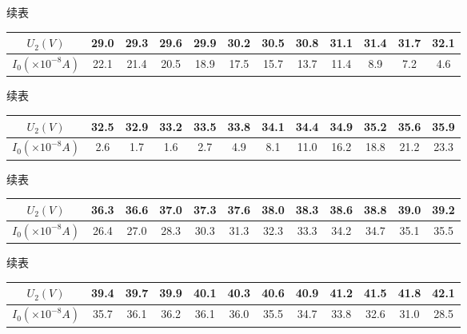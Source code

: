 \documentclass{article}
\begin{document}
    续表

    \begin{center}
        \begin{tabular}{|c|c|c|c|c|c|c|c|c|c|c|c|}
            \hline
            $U_2(V)$ & 29.0  & 29.3  & 29.6  & 29.9  & 30.2  & 30.5  & 30.8  & 31.1  & 31.4  & 31.7  & 32.1  \bigstrut\\
            \hline
            $I_0(\times 10^{-8}A)$ & 22.1  & 21.4  & 20.5  & 18.9  & 17.5  & 15.7  & 13.7  & 11.4  & 8.9   & 7.2   & 4.6  \bigstrut\\
            \hline
        \end{tabular}%
    \end{center}
    
    续表

    \begin{center}
        \begin{tabular}{|c|c|c|c|c|c|c|c|c|c|c|c|}
            \hline
            $U_2(V)$ & 32.5  & 32.9  & 33.2  & 33.5  & 33.8  & 34.1  & 34.4  & 34.9  & 35.2  & 35.6  & 35.9  \bigstrut\\
            \hline
            $I_0(\times 10^{-8}A)$ & 2.6   & 1.7   & 1.6   & 2.7   & 4.9   & 8.1   & 11.0  & 16.2  & 18.8  & 21.2  & 23.3  \bigstrut\\
            \hline
        \end{tabular}%
    \end{center}

    续表

    \begin{center}
        \begin{tabular}{|c|c|c|c|c|c|c|c|c|c|c|c|}
            \hline
            $U_2(V)$ & 36.3  & 36.6  & 37.0  & 37.3  & 37.6  & 38.0  & 38.3  & 38.6  & 38.8  & 39.0  & 39.2  \bigstrut\\
            \hline
            $I_0(\times 10^{-8}A)$ & 26.4  & 27.0  & 28.3  & 30.3  & 31.3  & 32.3  & 33.3  & 34.2  & 34.7  & 35.1  & 35.5  \bigstrut\\
            \hline
        \end{tabular}%
    \end{center}

    续表

    \begin{center}
        \begin{tabular}{|c|c|c|c|c|c|c|c|c|c|c|c|}
            \hline
            $U_2(V)$ & 39.4  & 39.7  & 39.9  & 40.1  & 40.3  & 40.6  & 40.9  & 41.2  & 41.5  & 41.8  & 42.1  \bigstrut\\
            \hline
            $I_0(\times 10^{-8}A)$ & 35.7  & 36.1  & 36.2  & 36.1  & 36.0  & 35.5  & 34.7  & 33.8  & 32.6  & 31.0  & 28.5  \bigstrut\\
            \hline
        \end{tabular}%
    \end{center}
\end{document}
